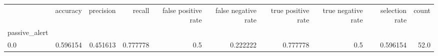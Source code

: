 \begin{tabular}{lrrrrrrrrr}
\toprule
{} &  accuracy &  precision &    recall &  false positive rate &  false negative rate &  true positive rate &  true negative rate &  selection rate &  count \\
passive\_alert &           &            &           &                      &                      &                     &                     &                 &        \\
\midrule
0.0           &  0.596154 &   0.451613 &  0.777778 &                  0.5 &             0.222222 &            0.777778 &                 0.5 &        0.596154 &   52.0 \\
\bottomrule
\end{tabular}
